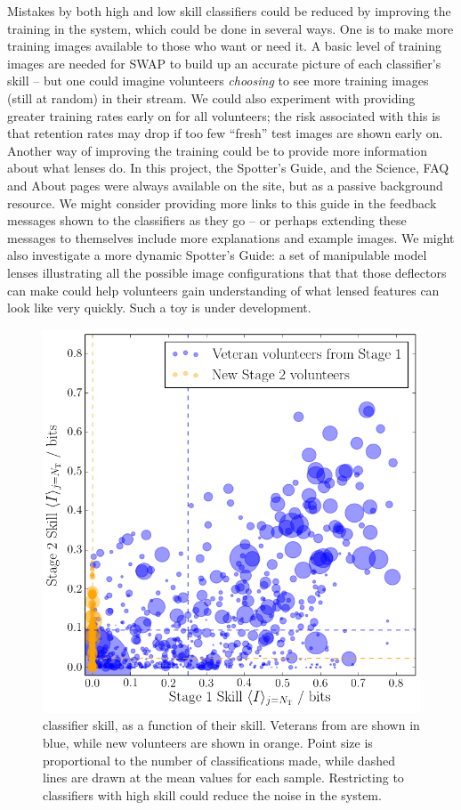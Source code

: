 \documentclass[useAMS,usenatbib,a4paper]{mn2e}
\begin{document}
Mistakes by both high and low skill classifiers could be reduced by improving
the training in the system, which could be done in several ways. One is to
make more training images available to those who want or need it. A basic
level of training images are needed for SWAP to build up an accurate picture
of each classifier's skill -- but one could imagine volunteers {\it choosing}
to see more training images (still at random) in their stream. We could also
experiment with providing greater training rates early on for all volunteers;
the risk associated with this is that retention rates may drop if too few
``fresh'' test images are shown early on. Another way of improving the
training could be to provide more information about what lenses do. In this
project, the Spotter's Guide, and the Science, FAQ and About pages were always available on the site, but as a
passive background resource. We might consider providing more links to this
guide in the feedback messages shown to the classifiers as they go -- or
perhaps extending these messages to themselves include more explanations and
example images. We might also investigate a more dynamic Spotter's Guide: a
set of manipulable model lenses illustrating all the possible image
configurations that that those deflectors can make could help volunteers gain
understanding of what lensed features can look like very quickly. Such a toy
is under development.

\begin{figure}
\centering\includegraphics[width=0.9\linewidth]{sw-system-figs/stage2_veteran_contribution.png}
\caption{\StageTwo classifier skill, as a function of their \StageOne skill.
Veterans from \StageOne  are shown in blue, while new volunteers are shown in
orange. Point size is proportional to the number of \StageTwo classifications
made, while dashed lines are drawn at the mean values for each sample.
Restricting \StageTwo to classifiers with high \StageOne skill could reduce the
noise in the system.}
\label{fig:discuss:performance:stage1vstage2}
\end{figure}
\end{document}
